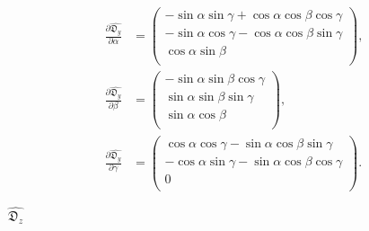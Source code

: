 \documentclass[a4paper,11pt,twoside,openright]{book}
\def\lthtmlcheckvsize{\ifdim\ht\sizebox<\vsize 
  \ifdim\wd\sizebox<\hsize\expandafter\hfill\fi \expandafter\vfill
  \else\expandafter\vss\fi}%
\begin{document}
{\newpage\clearpage
\setcounter{equation}{174}
%
\begin{subequations}\begin{align}
\frac{\partial \widehat{\mathfrak{D}_y}}{\partial \alpha} &= \begin{pmatrix}
-\sin \alpha \sin \gamma + \cos \alpha \cos \beta \cos \gamma \\
-\sin \alpha \cos \gamma - \cos \alpha \cos \beta \sin \gamma \\
\cos \alpha \sin \beta \\
\end{pmatrix}, \\
\frac{\partial \widehat{\mathfrak{D}_y}}{\partial \beta} &= \begin{pmatrix}
-\sin \alpha \sin \beta \cos \gamma \\
\sin \alpha \sin \beta \sin \gamma \\
\sin \alpha \cos \beta \\
\end{pmatrix}, \\
\frac{\partial \widehat{\mathfrak{D}_y}}{\partial \gamma} &= \begin{pmatrix}
\cos \alpha \cos \gamma - \sin \alpha \cos \beta \sin \gamma \\
-\cos \alpha \sin \gamma - \sin \alpha \cos \beta \cos \gamma \\
0 \\
\end{pmatrix}.
\end{align}\end{subequations}%
\lthtmldisplayZ
\lthtmlcheckvsize\clearpage}

{\newpage\clearpage
{}%
$ \widehat{{\mathfrak{D}_z}}$%
\lthtmlindisplaymathZ
\lthtmlcheckvsize\clearpage}
\end{document}
